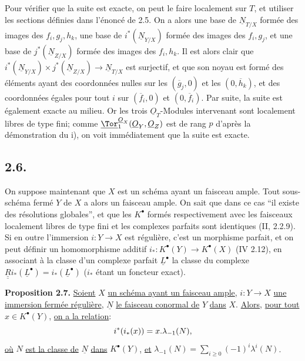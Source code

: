 
Pour vérifier que la suite est exacte, on peut le faire localement sur \(T\), et utiliser les sections définies dans l'énoncé de 2.5. On a alors une base de \(\underline{N}_{T/X}\) formée des images des \(f_i,g_j,h_k\), une base de \(i^*(\underline{N}_{Y/X})\) formée des images des \(f_i,g_j\), et une base de \(j^*(\underline{N}_{Z/X})\) formée des images des \(f_i,h_k\). Il est alors clair que \(i^*(\underline{N}_{Y/X})\times j^*(\underline{N}_{Z/X})\to \underline{N}_{T/X}\) est surjectif, et que son noyau est formé des éléments ayant des coordonnées nulles sur les \((\overline g_j,0)\) et les \((0,\overline h_k)\), et des coordonnées égales pour tout \(i\) sur \((\overline f_i,0)\) et \((0,\overline f_i)\). Par suite, la suite est également exacte au milieu. Or les trois \(\underline{O}_T\)-Modules intervenant sont localement libres de type fini; comme \(\underline{\Tor}_1^{\underline{O}_X}(\underline{O}_Y,\underline{O}_Z)\) est de rang \(p\) d'après la démonstration du i), on voit immédiatement que la suite est exacte.

\subsection*{2.6.}
On suppose maintenant que \(X\) est un schéma ayant un faisceau ample. Tout sous-schéma fermé \(Y\) de \(X\) a alors un faisceau ample. On sait que dans ce cas ``il existe des résolutions globales'', et que les \(K^{\bullet}\) formés respectivement avec les faisceaux localement libres de type fini et les complexes parfaits sont identiques (II, 2.2.9). Si en outre l'immersion \(i:Y\to X\) est régulière, c'est un morphisme parfait, et on peut définir un homomorphisme additif \(i_*:K^{\bullet}(Y)\longrightarrow K^{\bullet}(X)\) (IV 2.12), en associant à la classe d'un complexe parfait \(\underline{L}^\bullet\) la classe du complexe \(\underline{\underline{R}}i_*(\underline{L}^\bullet)=i_*(\underline{L}^\bullet)\) (\(i_*\) étant un foncteur exact).

\textbf{Proposition 2.7.} \uline{Soient} \(X\) \uline{un schéma ayant un faisceau ample}, \(i:Y\to X\) \uline{une immersion fermée régulière}, \(\underline{N}\) \uline{le faisceau conormal de} \(Y\) \uline{dans} \(X\). \uline{Alors}, \uline{pour tout} \(x\in K^{\bullet}(Y)\), \uline{on a la relation}:
\begin{equation}\notag
i^*(i_*(x))=x.\lambda_{-1}(N),
\end{equation}
\uline{où} \(N\) \uline{est la classe de} \(\underline{N}\) \uline{dans} \(K^{\bullet}(Y)\), \uline{et} \(\lambda_{-1}(N)=\sum_{i\ge0}(-1)^i\lambda^i(N)\).


